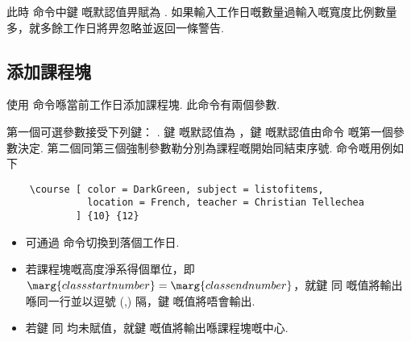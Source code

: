 \documentclass[letterpaper]{l3doc}
\newenvironment{example}{\begin{list}{}{\leftmargin=3em}\item }{\end{list}}
\begin{document}
此時  命令中鍵  嘅默認值畀賦為 . 如果輸入工作日嘅數量過輸入嘅寬度比例數量多，就多餘工作日將畀忽略並返回一條警告.

\subsection{添加課程塊}

使用  命令喺當前工作日添加課程塊. 此命令有兩個參數.

\begin{example}
\end{example}

第一個可選參數接受下列鍵：    . 鍵  嘅默認值為 ，鍵  嘅默認值由命令  嘅第一個參數決定. 第二個同第三個強制參數勒分別為課程嘅開始同結束序號.  命令嘅用例如下

\begin{Verbatim}
    \course [ color = DarkGreen, subject = listofitems, 
              location = French, teacher = Christian Tellechea
            ] {10} {12}
\end{Verbatim}

\begin{center}
    \noindent{}
\end{center}

\begin{itemize}
    \item 可通過  命令切換到落個工作日.
    \item 若課程塊嘅高度淨系得個單位，即$\marg{class start number} = \marg{class end number}$，就鍵  同  嘅值將輸出喺同一行並以逗號 (,) 隔，鍵  嘅值將唔會輸出.
    \item 若鍵  同  均未賦值，就鍵  嘅值將輸出喺課程塊嘅中心.
\end{itemize}


\end{document}
